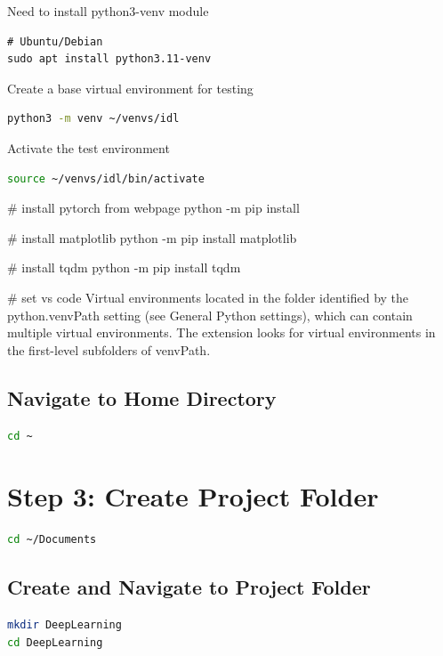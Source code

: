 \documentclass[11pt,a4paper]{article}
\begin{document}
Need to install python3-venv module

\begin{lstlisting}
# Ubuntu/Debian
sudo apt install python3.11-venv
\end{lstlisting}

Create a base virtual environment for testing
\begin{lstlisting}[language=bash]
python3 -m venv ~/venvs/idl
\end{lstlisting}

Activate the test environment
\begin{lstlisting}[language=bash]
source ~/venvs/idl/bin/activate
\end{lstlisting}

# install pytorch from webpage
python -m pip install 

# install matplotlib
python -m pip install matplotlib

# install tqdm
python -m pip install tqdm

# set vs code
Virtual environments located in the folder identified by the python.venvPath setting (see General Python settings), which can contain multiple virtual environments. The extension looks for virtual environments in the first-level subfolders of venvPath.


\subsection{Navigate to Home Directory}

\begin{lstlisting}[language=bash]
cd ~
\end{lstlisting}


\section{Step 3: Create Project Folder}


\begin{lstlisting}[language=bash]
cd ~/Documents
\end{lstlisting}








\subsection{Create and Navigate to Project Folder}

\begin{lstlisting}[language=bash]
mkdir DeepLearning
cd DeepLearning
\end{lstlisting}
\end{document}
